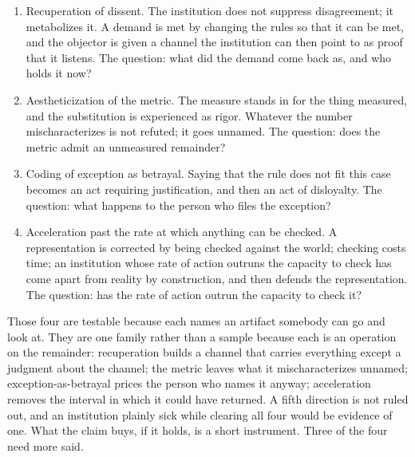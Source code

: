 \begin{enumerate}
  \item Recuperation of dissent. The institution does not suppress disagreement; it metabolizes it. A demand is met by changing the rules so that it can be met, and the objector is given a channel the institution can then point to as proof that it listens. The question: what did the demand come back as, and who holds it now?
  \item Aestheticization of the metric. The measure stands in for the thing measured, and the substitution is experienced as rigor. Whatever the number mischaracterizes is not refuted; it goes unnamed. The question: does the metric admit an unmeasured remainder?
  \item Coding of exception as betrayal. Saying that the rule does not fit this case becomes an act requiring justification, and then an act of disloyalty. The question: what happens to the person who files the exception?
  \item Acceleration past the rate at which anything can be checked. A representation is corrected by being checked against the world; checking costs time; an institution whose rate of action outruns the capacity to check has come apart from reality by construction, and then defends the representation. The question: has the rate of action outrun the capacity to check it?
\end{enumerate}

Those four are testable because each names an artifact somebody can go and look at. They are one family rather than a sample because each is an operation on the remainder: recuperation builds a channel that carries everything except a judgment about the channel; the metric leaves what it mischaracterizes unnamed; exception-as-betrayal prices the person who names it anyway; acceleration removes the interval in which it could have returned. A fifth direction is not ruled out, and an institution plainly sick while clearing all four would be evidence of one. What the claim buys, if it holds, is a short instrument. Three of the four need more said.


